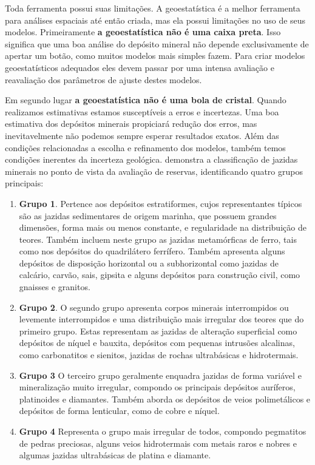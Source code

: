 Toda ferramenta possui suas limitações. A geoestatística é a melhor ferramenta para análises espaciais até então criada, mas ela possui limitações no uso de seus modelos. Primeiramente \textbf{a geoestatística não é uma caixa preta}. Isso significa que uma boa análise do depósito mineral não depende exclusivamente de apertar um botão, como muitos modelos mais simples fazem. Para criar modelos geoestatísticos adequados eles devem passar por uma intensa avaliação e reavaliação dos parâmetros de ajuste destes modelos. 

Em segundo lugar \textbf{a geoestatística não é uma bola de cristal}. Quando realizamos estimativas estamos susceptíveis a erros e incertezas. Uma boa estimativa dos depósitos minerais propiciará redução dos erros, mas inevitavelmente não podemos sempre esperar resultados exatos. Além das condições relacionadas a escolha e refinamento dos modelos, também temos condições inerentes da incerteza geológica.  \citet{maranhao1985introduccao} demonstra a classificação de jazidas minerais no ponto de vista da avaliação de reservas, identificando quatro grupos principais: 

\begin{enumerate}
	\item \textbf{Grupo 1}. Pertence aos depósitos estratiformes, cujos representantes típicos são as jazidas sedimentares de origem marinha, que possuem grandes dimensões, forma mais ou menos constante, e regularidade na distribuição de teores.  Também  incluem neste grupo as jazidas metamórficas de ferro, tais como nos depósitos do quadrilátero ferrífero. Também apresenta alguns depósitos de disposição horizontal ou a subhorizontal como jazidas de calcário, carvão, sais, gipsita e alguns depósitos para construção civil, como gnaisses e granitos.
	\item \textbf{Grupo 2}. O segundo grupo apresenta corpos minerais interrompidos ou levemente interrompidos e uma distribuição mais irregular dos teores que do primeiro grupo. Estas representam as jazidas de alteração superficial como depósitos de níquel e bauxita, depósitos com pequenas intrusões alcalinas, como carbonatitos e sienitos, jazidas de rochas ultrabásicas e hidrotermais.
	\item \textbf{Grupo 3} O terceiro grupo geralmente enquadra jazidas de forma variável e mineralização muito irregular, compondo os principais depósitos auríferos, platinoides e diamantes. Também aborda os depósitos de veios polimetálicos e depósitos de forma lenticular, como de cobre e níquel. 
	\item \textbf{Grupo 4} Representa o grupo mais irregular de todos, compondo pegmatitos de pedras preciosas, alguns veios hidrotermais com metais raros e nobres e algumas jazidas ultrabásicas de platina e diamante. 
\end{enumerate}

